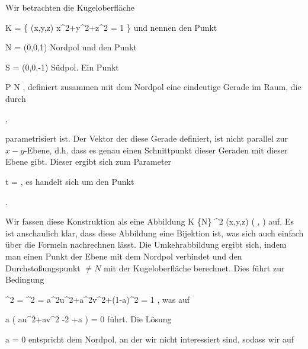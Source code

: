 {

Wir betrachten die Kugeloberfläche

\mavergleichskettedisp
{\vergleichskette
{ K
}
{ =} { \left\{ (x,y,z)  \mid   x^2+y^2+z^2 = 1        \right\}
}
{ } {
}
{ } {
}
{ } {
}
}
{}{}{}
und nennen den Punkt

\mavergleichskette
{\vergleichskette
{ N
}
{ = }{ (0,0,1)
}
{  }{
}
{    }{
}
{   }{
}
}
{}{}{}
Nordpol und den Punkt

\mavergleichskette
{\vergleichskette
{ S
}
{ = }{ (0,0,-1)
}
{  }{
}
{    }{
}
{   }{
}
}
{}{}{}
Südpol. Ein Punkt

 {}
 {P \neq N} {}
 {} {} {} {,}
definiert zusammen mit dem Nordpol eine eindeutige Gerade im Raum, die durch

 { , }

parametrisiert ist. Der Vektor
 der diese Gerade definiert, ist nicht parallel zur $x-y$-Ebene, d.h. dass es genau einen Schnittpunkt dieser Geraden mit dieser Ebene gibt. Dieser ergibt sich zum Parameter

\mavergleichskettedisp
{\vergleichskette
{ t
}
{ =} { {  }
}
{ } {
}
{ } {
}
{ } {
}
}
{}{}{,}
es handelt sich um den Punkt

 { . }

Wir fassen diese Konstruktion als eine Abbildung
\maabbeledisp {\alpha} {K \setminus \{N\}} { \R^2
} {(x,y,z)} { \left(  {  }, {  }  \right)
} {}
auf. Es ist anschaulich klar, dass diese Abbildung eine Bijektion ist, was sich auch einfach über die Formeln nachrechnen lässt. Die Umkehrabbildung ergibt sich, indem man einen Punkt
 der Ebene mit dem Nordpol verbindet und den Durchstoßungspunkt $\neq N$  mit der Kugeloberfläche berechnet. Dies führt zur Bedingung

\mavergleichskettealignhandlinks
{\vergleichskettealignhandlinks
{  \Vert^2
}
{ =} {  \Vert^2
}
{ =} { a^2u^2+a^2v^2+(1-a)^2
}
{ =} { 1
}
{ } {
}
}
{}
{}{,}
was auf

\mavergleichskettedisp
{\vergleichskette
{ a \left(  au^2+av^2 -2 +a  \right)
}
{ =} { 0
}
{ } {
}
{ } {
}
{ } {
}
}
{}{}{}
führt. Die Lösung

\mavergleichskette
{\vergleichskette
{ a
}
{ = }{ 0
}
{  }{
}
{    }{
}
{   }{
}
}
{}{}{}
entspricht dem Nordpol, an der wir nicht interessiert sind, sodass wir auf

}
